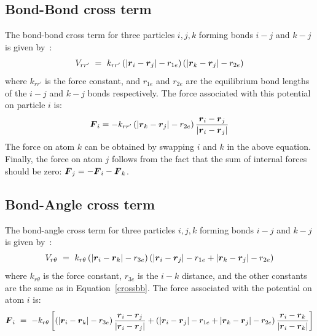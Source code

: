\subsection{Bond-Bond cross term}
\label{subsec:bondbondcross}
The bond-bond cross term for three particles $i, j, k$ forming bonds
$i-j$ and $k-j$ is given by~\cite{Lawrence2003b}:
\begin{equation}
V_{rr'} ~=~ k_{rr'} \left(\left|\ve{r}_{i}-\ve{r}_j\right|-r_{1e}\right) \left(\left|\ve{r}_{k}-\ve{r}_j\right|-r_{2e}\right)
\label{crossbb}
\end{equation}
where $k_{rr'}$ is the force constant, and $r_{1e}$ and $r_{2e}$ are the
equilibrium bond lengths of the $i-j$ and $k-j$ bonds respectively. The force
associated with this potential on particle $i$ is:
\begin{equation}
\ve{F}_{i} = -k_{rr'}\left(\left|\ve{r}_{k}-\ve{r}_j\right|-r_{2e}\right)\frac{\ve{r}_i-\ve{r}_j}{\left|\ve{r}_{i}-\ve{r}_j\right|}
\end{equation}
The force on atom $k$ can be obtained by swapping $i$ and $k$ in the above
equation. Finally, the force on atom $j$ follows from the fact that the sum
of internal forces should be zero: $\ve{F}_j = -\ve{F}_i-\ve{F}_k$.

\subsection{Bond-Angle cross term}
\label{subsec:bondanglecross}
The bond-angle cross term for three particles $i, j, k$ forming bonds
$i-j$ and $k-j$ is given by~\cite{Lawrence2003b}:
\begin{equation}
V_{r\theta} ~=~ k_{r\theta} \left(\left|\ve{r}_{i}-\ve{r}_k\right|-r_{3e} \right) \left(\left|\ve{r}_{i}-\ve{r}_j\right|-r_{1e} + \left|\ve{r}_{k}-\ve{r}_j\right|-r_{2e}\right)
\end{equation}
where $k_{r\theta}$ is the force constant, $r_{3e}$ is the $i-k$ distance,
and the other constants are the same as in Equation~\ref{crossbb}. The force
associated with the potential on atom $i$ is:
\begin{equation}
\ve{F}_{i} ~=~ -k_{r\theta}\left[\left(\left|\ve{r}_{i}-\ve{r}_{k}\right|-r_{3e}\right)\frac{\ve{r}_i-\ve{r}_j}{\left|\ve{r}_{i}-\ve{r}_j\right|} \\
+ \left(\left|\ve{r}_{i}-\ve{r}_j\right|-r_{1e} + \left|\ve{r}_{k}-\ve{r}_j\right|-r_{2e}\right)\frac{\ve{r}_i-\ve{r}_k}{\left|\ve{r}_{i}-\ve{r}_k\right|}\right]
\end{equation}

